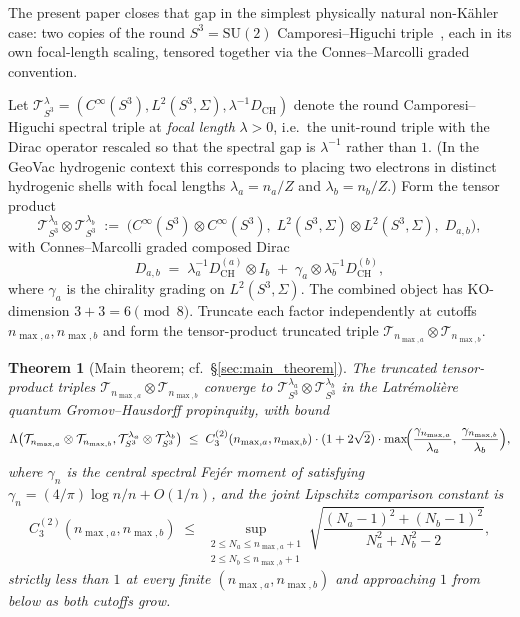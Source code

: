 \documentclass[11pt,a4paper]{article}
\theoremstyle{plain}
\newtheorem{theorem}{Theorem}[section]
\theoremstyle{definition}
\newcommand{\nmaxa}{n_{\max,a}}
\newcommand{\nmaxb}{n_{\max,b}}
\newcommand{\sthree}{S^{3}}
\newcommand{\Tcal}{\mathcal{T}}
\newcommand{\SU}{\mathrm{SU}}
\newcommand{\DCH}{D_{\mathrm{CH}}}
\begin{document}
The present paper closes that gap in the simplest physically natural
non-K\"ahler case: two copies of the round $\sthree = \SU(2)$
Camporesi--Higuchi triple~\cite{camporesi_higuchi1996}, each in its own
focal-length scaling, tensored together via the Connes--Marcolli
graded convention.

Let $\Tcal_{\sthree}^{\lambda} = (C^\infty(\sthree),
L^2(\sthree, \Sigma), \lambda^{-1} \DCH)$ denote the round
Camporesi--Higuchi spectral triple at \emph{focal length} $\lambda > 0$,
i.e.\ the unit-round triple with the Dirac operator rescaled so that
the spectral gap is $\lambda^{-1}$ rather than $1$. (In the GeoVac
hydrogenic context this corresponds to placing two electrons in
distinct hydrogenic shells with focal lengths $\lambda_a = n_a / Z$ and
$\lambda_b = n_b / Z$.) Form the tensor product
\begin{equation}\label{eq:tensor_triple}
   \Tcal_{\sthree}^{\lambda_a} \otimes \Tcal_{\sthree}^{\lambda_b}
   \;:=\; \bigl(C^\infty(\sthree) \otimes C^\infty(\sthree),\;
          L^2(\sthree, \Sigma) \otimes L^2(\sthree, \Sigma),\;
          D_{a,b} \bigr),
\end{equation}
with Connes--Marcolli graded composed Dirac
\begin{equation}\label{eq:CM_dirac}
   D_{a,b} \;=\; \lambda_a^{-1} \DCH^{(a)} \otimes I_b
                \;+\; \gamma_a \otimes \lambda_b^{-1} \DCH^{(b)},
\end{equation}
where $\gamma_a$ is the chirality grading on $L^2(\sthree, \Sigma)$.
The combined object has KO-dimension $3 + 3 = 6 \pmod 8$. Truncate
each factor independently at cutoffs $\nmaxa, \nmaxb$ and form the
tensor-product truncated triple $\Tcal_{\nmaxa} \otimes \Tcal_{\nmaxb}$.

\begin{theorem}[Main theorem; cf.~\S\ref{sec:main_theorem}]
\label{thm:main_intro}
The truncated tensor-product triples $\Tcal_{\nmaxa} \otimes
\Tcal_{\nmaxb}$ converge to $\Tcal_{\sthree}^{\lambda_a} \otimes
\Tcal_{\sthree}^{\lambda_b}$ in the Latr\'emoli\`ere quantum
Gromov--Hausdorff propinquity, with bound
\begin{equation}\label{eq:main_rate_intro}
   \Lambda\bigl(\Tcal_{\nmaxa} \otimes \Tcal_{\nmaxb},
                \Tcal_{\sthree}^{\lambda_a} \otimes
                \Tcal_{\sthree}^{\lambda_b}\bigr)
   \;\le\; C_3^{(2)}(\nmaxa, \nmaxb) \cdot (1 + 2\sqrt{2}) \cdot
   \max\!\Bigl(\frac{\gamma_{\nmaxa}}{\lambda_a},\,
                \frac{\gamma_{\nmaxb}}{\lambda_b}\Bigr),
\end{equation}
where $\gamma_n$ is the central spectral Fej\'er moment of
\cite{loutey_paper38} satisfying $\gamma_n = (4/\pi) \log n / n +
O(1/n)$, and the joint Lipschitz comparison constant is
\begin{equation}\label{eq:C3_2_intro}
   C_3^{(2)}(\nmaxa, \nmaxb)
   \;\le\; \sup_{\substack{2 \le N_a \le \nmaxa+1 \\ 2 \le N_b \le \nmaxb+1}}
            \sqrt{\frac{(N_a - 1)^2 + (N_b - 1)^2}{N_a^2 + N_b^2 - 2}},
\end{equation}
strictly less than $1$ at every finite $(\nmaxa, \nmaxb)$ and
approaching $1$ from below as both cutoffs grow.
\end{theorem}
\end{document}
